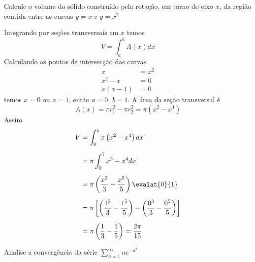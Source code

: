 \documentclass[a4paper,12pt,fleqn]{article}
\begin{document}
\vspace{\baselineskip}
Calcule o volume do sólido construído pela rotação, em torno do eixo $x$, da região
contida entre as curvas \(y=x\) e \(y=x^2\)

\begin{answer}
  Integrando por seções transversais em $x$ temos
  \[
    V = \int_a^b A(x) dx
  \]
  Calculando os pontos de intersecção das curvas
  \begin{align*}
    x & = x^2 \\
    x^2 - x & = 0 \\
    x(x-1) & = 0
  \end{align*}
  temos \(x=0\) ou \(x=1\), então \(a=0\), \(b=1\).
  A área da seção transversal é
  \[
    A(x) = \pi r_1^2 - \pi r_2^2 = \pi \left(x^2-x^4\right)
  \]
  Assim
  \begin{align*}
    V
    & = \int_0^1 \pi \left(x^2-x^4\right) dx \\[2mm]
    & = \pi \int_0^1 x^2-x^4 dx \\[2mm]
    & = \pi \left(\frac{x^3}{3} - \frac{x^5}{5}\right)\evalat{0}{1} \\[2mm]
    & = \pi \left[
          \left(\frac{1^3}{3} - \frac{1^5}{5}\right) -
          \left(\frac{0^3}{3} - \frac{0^5}{5}\right)
        \right] \\[2mm]
    & = \pi \left(\frac{1}{3} - \frac{1}{5}\right)
     = \frac{2\pi}{15}
  \end{align*}
\end{answer}

\vspace{\baselineskip}
Analise a convergência da série \(\sum_{n=1}^\infty ne^{-n^2}\)
\end{document}
